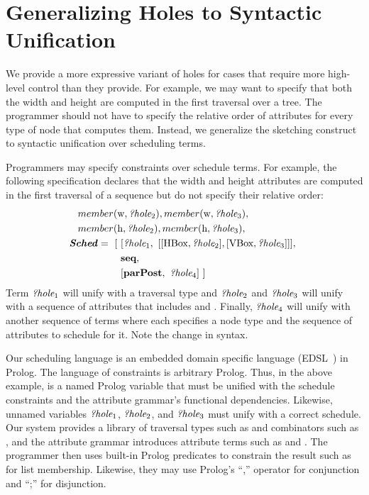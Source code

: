 \section{Generalizing Holes to Syntactic Unification}
We provide a more expressive variant of holes for cases that require more high-level control than they provide. For example, we may want to specify that both the width and height are computed in the first traversal over a tree. The programmer should not have to specify the relative order of attributes for every type of node that computes them. Instead, we generalize the sketching construct to syntactic unification over scheduling terms. 

Programmers may specify constraints over schedule terms. For example, the following specification declares that the width and height attributes are computed in the first traversal of a sequence but do not specify their relative order:
\begin{align*}
member(&\text{w}, {\emph{?hole}}_2), member(\text{w}, {\emph{?hole}}_3),\\
member(&\text{h}, {\emph{?hole}}_2), member(\text{h}, {\emph{?hole}}_3),\\
\textbf{\emph{Sched}}  = ~[&~[ {\emph{?hole}}_1, ~ [ [\text{HBox}, {\emph{?hole}}_2], [\text{VBox}, {\emph{?hole}}_3]]], ~\\
& ~ \textbf{seq},\\
& ~  [\text{\textbf{parPost}}, ~{\emph{?hole}}_4]~]
\end{align*}
Term ${\emph{?hole}}_1$ will unify with a traversal type and ${\emph{?hole}}_2$ and ${\emph{?hole}}_3$ will unify with a sequence of attributes that includes  and . Finally, ${\emph{?hole}}_4$ will unify with another sequence of terms where each specifies a node type and the sequence of attributes to schedule for it. Note the change in syntax.

Our scheduling language is an embedded domain specific language (EDSL~\cite{??}) in Prolog. The language of constraints is arbitrary Prolog. Thus, in the above example,  is a named Prolog variable that must be unified with the schedule constraints and the attribute grammar's functional dependencies. Likewise, unnamed variables ${\emph{?hole}}_1$, ${\emph{?hole}}_2$, and ${\emph{?hole}}_3$ must unify with a correct schedule. Our system provides a library of traversal types such as  and combinators such as , and the attribute grammar introduces attribute terms such as  and . The programmer then uses built-in Prolog predicates to constrain the result such as  for list membership. Likewise, they may use Prolog's ``,'' operator for conjunction and ``;'' for disjunction. 

